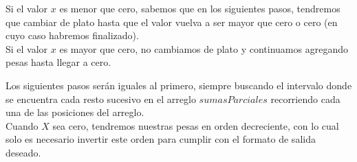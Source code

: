 Si el valor $x$ es menor que cero, sabemos que en los siguientes pasos, tendremos que cambiar de plato hasta que el valor vuelva a ser mayor que cero o cero (en cuyo caso habremos finalizado).\\

Si el valor $x$ es mayor que cero, no cambiamos de plato y continuamos agregando pesas hasta llegar a cero.

Los siguientes pasos ser\'an iguales al primero, siempre buscando el intervalo donde se encuentra cada resto sucesivo en el arreglo $sumasParciales$ recorriendo cada una de las posiciones del arreglo.\\

Cuando $X$ sea cero, tendremos nuestras pesas en orden decreciente, con lo cual solo es necesario invertir este orden para cumplir con el formato de salida deseado.